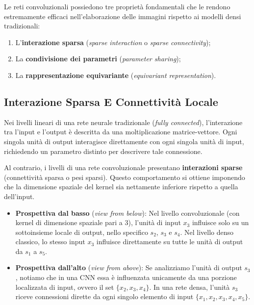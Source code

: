﻿\documentclass[11pt, a4paper]{article}
\begin{document}
Le reti convoluzionali possiedono tre proprietà fondamentali che le rendono estremamente efficaci nell'elaborazione delle immagini rispetto ai modelli densi tradizionali:
\begin{enumerate}
    \item L'\textbf{interazione sparsa} (\emph{sparse interaction} o \emph{sparse connectivity});
    \item La \textbf{condivisione dei parametri} (\emph{parameter sharing});
    \item La \textbf{rappresentazione equivariante} (\emph{equivariant representation}).
\end{enumerate}

\subsection{Interazione Sparsa E Connettività Locale}

Nei livelli lineari di una rete neurale tradizionale (\emph{fully connected}), l'interazione tra l'input e l'output è descritta da una moltiplicazione matrice-vettore. Ogni singola unità di output interagisce direttamente con ogni singola unità di input, richiedendo un parametro distinto per descrivere tale connessione.

Al contrario, i livelli di una rete convoluzionale presentano \textbf{interazioni sparse} (connettività sparsa o pesi sparsi). Questo comportamento si ottiene imponendo che la dimensione spaziale del kernel sia nettamente inferiore rispetto a quella dell'input.


\begin{itemize}
    \item \textbf{Prospettiva dal basso} (\emph{view from below}): Nel livello convoluzionale (con kernel di dimensione spaziale pari a 3), l'unità di input $x_3$ influisce solo su un sottoinsieme locale di output, nello specifico $s_2$, $s_3$ e $s_4$. Nel livello denso classico, lo stesso input $x_3$ influisce direttamente su tutte le unità di output da $s_1$ a $s_5$.
\end{itemize}


\begin{itemize}
    \item \textbf{Prospettiva dall'alto} (\emph{view from above}): Se analizziamo l'unità di output $s_3$, notiamo che in una CNN essa è influenzata unicamente da una porzione localizzata di input, ovvero il set $\{x_2, x_3, x_4\}$. In una rete densa, l'unità $s_3$ riceve connessioni dirette da ogni singolo elemento di input $\{x_1, x_2, x_3, x_4, x_5\}$.
\end{itemize}
\end{document}
